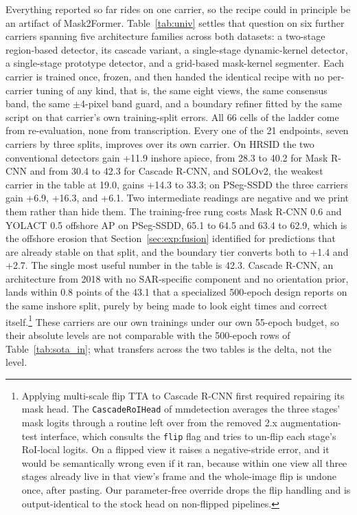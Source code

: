Everything reported so far rides on one carrier, so the recipe could in principle be an artifact of Mask2Former. Table~\ref{tab:univ} settles that question on six further carriers spanning five architecture families across both datasets: a two-stage region-based detector, its cascade variant, a single-stage dynamic-kernel detector, a single-stage prototype detector, and a grid-based mask-kernel segmenter. Each carrier is trained once, frozen, and then handed the identical recipe with no per-carrier tuning of any kind, that is, the same eight views, the same consensus band, the same $\pm$4-pixel band guard, and a boundary refiner fitted by the same script on that carrier's own training-split errors. All 66 cells of the ladder come from re-evaluation, none from transcription. Every one of the 21 endpoints, seven carriers by three splits, improves over its own carrier. On HRSID the two conventional detectors gain +11.9 inshore apiece, from 28.3 to 40.2 for Mask R-CNN and from 30.4 to 42.3 for Cascade R-CNN, and SOLOv2, the weakest carrier in the table at 19.0, gains +14.3 to 33.3; on PSeg-SSDD the three carriers gain +6.9, +16.3, and +6.1. Two intermediate readings are negative and we print them rather than hide them. The training-free rung costs Mask R-CNN 0.6 and YOLACT 0.5 offshore AP on PSeg-SSDD, 65.1 to 64.5 and 63.4 to 62.9, which is the offshore erosion that Section~\ref{sec:exp:fusion} identified for predictions that are already stable on that split, and the boundary tier converts both to +1.4 and +2.7. The single most useful number in the table is 42.3. Cascade R-CNN, an architecture from 2018 with no SAR-specific component and no orientation prior, lands within 0.8 points of the 43.1 that a specialized 500-epoch design reports on the same inshore split, purely by being made to look eight times and correct itself.\footnote{Applying multi-scale flip TTA to Cascade R-CNN first required repairing its mask head. The \texttt{CascadeRoIHead} of mmdetection averages the three stages' mask logits through a routine left over from the removed 2.x augmentation-test interface, which consults the \texttt{flip} flag and tries to un-flip each stage's RoI-local logits. On a flipped view it raises a negative-stride error, and it would be semantically wrong even if it ran, because within one view all three stages already live in that view's frame and the whole-image flip is undone once, after pasting. Our parameter-free override drops the flip handling and is output-identical to the stock head on non-flipped pipelines.} These carriers are our own trainings under our own 55-epoch budget, so their absolute levels are not comparable with the 500-epoch rows of Table~\ref{tab:sota_in}; what transfers across the two tables is the delta, not the level.

